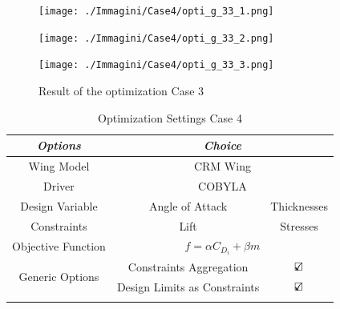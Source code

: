 \begin{figure}[H]
	\centering
	\texttt{[image: ./Immagini/Case4/opti\_g\_33\_1.png]}
\end{figure}
\begin{figure}[H]
	\centering
	\texttt{[image: ./Immagini/Case4/opti\_g\_33\_2.png]}
\end{figure}
\begin{figure}[H]
	\centering
	\texttt{[image: ./Immagini/Case4/opti\_g\_33\_3.png]}
	\caption{Result of the optimization Case 3}
	\label{fig:6_4}
\end{figure}

\begin{table}[H]
	\centering
	\begin{tabular}{ccc}
		\hline
		\multicolumn{1}{|c|}{\textit{Options}}                          & \multicolumn{2}{c|}{\textit{Choice}}                                               \\ \hline
		\multicolumn{1}{|c|}{Wing Model}                       & \multicolumn{2}{c|}{CRM Wing}                                                     \\ \hline
		\multicolumn{1}{|c|}{Driver}                           & \multicolumn{2}{c|}{COBYLA}                                                     \\ \hline
		\multicolumn{1}{|c|}{Design Variable}                  & \multicolumn{1}{c|}{Angle of Attack}&\multicolumn{1}{c|}{Thicknesses}                                                     \\ \hline
		\multicolumn{1}{|c|}{Constraints}                  & \multicolumn{1}{c|}{Lift }&\multicolumn{1}{c|}{Stresses}                                                     \\ \hline
		\multicolumn{1}{|c|}{Objective Function}               & \multicolumn{2}{c|}{$f= \alpha C_{D_i}+\beta m$}                                                     \\ \hline
		\multicolumn{1}{|c|}{\multirow{2}{*}{Generic Options}} & \multicolumn{1}{c|}{Constraints Aggregation}      & \multicolumn{1}{c|}{$\text{\rlap{$\checkmark$}}\square$} \\ \cline{2-3} 
		\multicolumn{1}{|c|}{}                                 & \multicolumn{1}{c|}{Design Limits as Constraints} & \multicolumn{1}{c|}{$\text{\rlap{$\checkmark$}}\square$} \\ \hline
		&                                                   &                      
	\end{tabular}
	\caption{Optimization Settings Case 4}
	\label{tab:6_4}
\end{table}
